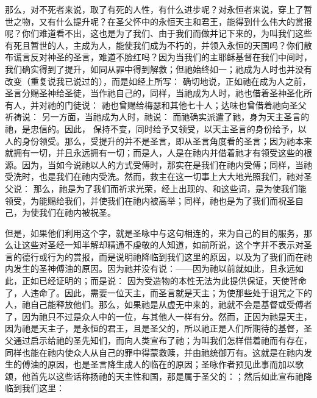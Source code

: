 那么，对不死者来说，取了有死的人性，有什么进步呢？对永恒者来说，穿上了暂世之物，又有什么提升呢？在圣父怀中的永恒天主和君王，能得到什么伟大的赏报呢？你们难道看不出，这也是为了我们、由于我们而做并记下来的，为叫我们这些有死且暂世的人，主成为人，能使我们成为不朽的，并领入永恒的天国吗？你们散布谎言反对神圣的圣言，难道不脸红吗？因为当我们的主耶稣基督在我们中间时，我们确实得到了提升，如同从罪中得到解救；但祂始终如一；祂成为人时也并没有改变（重复说我已说过的），而是如经上所写： 确切地说，正如祂在成为人之前，圣言分赐圣神给圣徒，当作祂自己的，同样，当祂成为人时，祂也借着圣神圣化所有人，并对祂的门徒说： 祂也曾赐给梅瑟和其他七十人；达味也曾借着祂向圣父祈祷说： 另一方面，当祂成为人时，祂说： 而祂确实派遣了祂，身为天主圣言的祂，是忠信的。因此， 保持不变，同时给予又领受，以天主圣言的身份给予，以人的身份领受。那么，受提升的并不是圣言，即从圣言角度看的圣言；因为祂本来就拥有一切，并且永远拥有一切；而是人，人是在祂内并借着祂才有领受这些的根源。因为，当如今说祂以人的方式受傅时，那实在是我们在祂内受傅；同样，当祂受洗时，也是我们在祂内受洗。然而，救主在这一切事上大大地光照我们，祂对圣父说： 那么，祂是为了我们而祈求光荣，经上出现的、和这些词，是为使我们能领受，为能赐给我们，并使我们在祂内被高举；同样，祂也是为了我们而祝圣自己，为使我们在祂内被祝圣。\par

但是，如果他们利用这个字，就是圣咏中与这句相连的，来为自己的目的服务，那么让这些对圣经一知半解却精通不虔敬的人知道，如前所说，这个字并不表示对圣言的德行或行为的赏报，而是说明祂降临到我们这里的原因，以及为了我们而在祂内发生的圣神傅油的原因。因为祂并没有说：——因为祂以前就如此，且永远如此，正如已经证明的；而是说： 因为受造物的本性无法为此提供保证，天使背命了，人违命了。因此，需要一位天主，而圣言就是天主；为使那些处于诅咒之下的人，祂自己能释放他们。那么，如果祂是从虚无中来的，祂就不会是基督或受傅者了，因为祂只不过是众人中的一位，与其他人一样有分。然而，正因为祂是天主，因为祂是天主子，是永恒的君王，且是圣父的，所以祂正是人们所期待的基督，圣父通过启示给祂的圣先知们，而向人类宣布了祂；为叫我们怎样借着祂而有存在，同样也能在祂内使众人从自己的罪中得蒙救赎，并由祂统御万有。这就是在祂内发生的傅油的原因，也是圣言降生成人的临在的原因；圣咏作者预见此事而加以歌颂，他首先以这些话称扬祂的天主性和国，那是属于圣父的：；然后如此宣布祂降临到我们这里：\par

